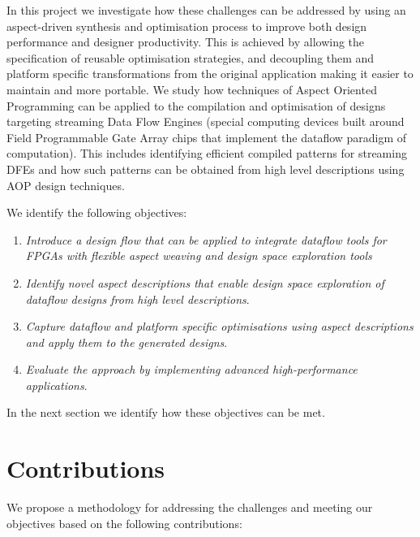 In this project we investigate how these challenges can be addressed
by using an aspect-driven synthesis and optimisation process to
improve both design performance and designer productivity. This is
achieved by allowing the specification of reusable optimisation
strategies, and decoupling them and platform specific transformations
from the original application making it easier to maintain and more
portable. We study how techniques of Aspect Oriented Programming can
be applied to the compilation and optimisation of designs targeting
streaming Data Flow Engines (special computing devices built around
Field Programmable Gate Array chips that implement the dataflow
paradigm of computation). This includes identifying efficient compiled
patterns for streaming DFEs and how such patterns can be obtained from
high level descriptions using AOP design techniques.

We identify the following objectives:

\begin{enumerate}
\item \emph{Introduce a design flow that can be applied to integrate
    dataflow tools for FPGAs with flexible aspect weaving and design
    space exploration tools}
\item \emph{Identify novel aspect descriptions that enable design
  space exploration of dataflow designs from high level
  descriptions}.

\item \emph{Capture dataflow and platform specific optimisations
  using aspect descriptions and apply them to the generated
  designs}.

\item \emph{Evaluate the approach by implementing advanced
  high-performance applications}.
\end{enumerate}

In the next section we identify how these objectives can be met.

\section{Contributions}

We propose a methodology for addressing the challenges and meeting our
objectives based on the following contributions:

